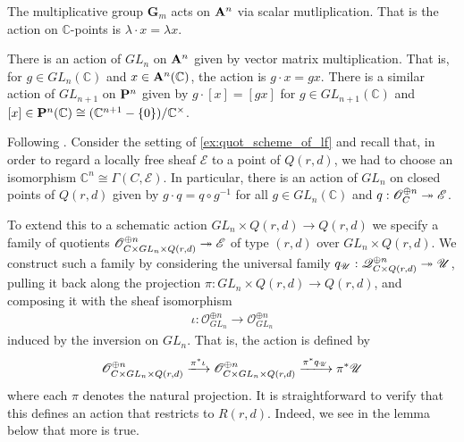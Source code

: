 \documentclass[12pt]{ociamthesis}  %
\begin{document}
\begin{example}
  The multiplicative group $\mathbf G_m$ acts on $\mathbf{A}^{n}_{}$
  via scalar mutliplication. That is the action on $\mathbb C$-points
  is $\lambda\cdot x = \lambda x$.
\end{example}

\begin{example}
  There is an action of $GL_n$ on $\mathbf{A}^{n}_{}$ given by vector
  matrix multiplication. That is, for $g\in GL_n(\mathbb C)$
  and $x\in\mathbf{A}^{n}_{}(\mathbb C)$, the action is $g\cdot x = gx$.
  There is a similar action of $GL_{n+1}$ on $\mathbf{P}^{n}_{}$
  given by $g\cdot[x] = [gx]$ for $g\in GL_{n+1}(\mathbb C)$
  and $[x]\in\mathbf{P}^{n}_{}(\mathbb C) \cong (\mathbb C^{n+1} - \{0\})/\mathbb C^\times$.
\end{example}

\begin{example}\label{ex:lf_action}
  Following \cite[Lemma 8.49]{hoskins2016}.
  Consider the setting of \ref{ex:quot_scheme_of_lf} and recall
  that, in order to regard a locally free sheaf $\mathscr E$ to a point of
  $Q(r,d)$, we had to choose an isomorphism
  $\mathbb C^n \cong \Gamma(C,\mathscr E)$. In particular, there
  is an action of $GL_n$ on closed points of $Q(r,d)$
  given by $g\cdot q = q\circ g^{-1}$ for all $g\in GL_n(\mathbb C)$
  and $q : \mathscr O^{\oplus n}_C \twoheadrightarrow \mathscr E$.

  To extend this to a schematic action $GL_n \times Q(r,d) \to Q(r,d)$
  we specify a family of quotients
  $\mathscr O^{\oplus n}_{C\times GL_n\times Q(r,d)}\twoheadrightarrow \mathscr E$
  of type $(r,d)$ over $GL_n\times Q(r,d)$. We construct such a family by
  considering the universal family $q_{\mathscr U}:\mathscr Q^{\oplus n}_{C\times Q(r,d)}\twoheadrightarrow \mathscr U$,
  pulling it back along the projection $\pi:GL_n\times Q(r,d)\to Q(r,d)$,
  and composing it with the sheaf isomorphism
  \begin{align*}
    \iota : \mathscr O^{\oplus n}_{GL_n} \to \mathscr O^{\oplus n}_{GL_n}
  \end{align*}
  induced by the inversion on $GL_n$. That is, the action is defined
  by
  \begin{align*}
    \mathscr O^{\oplus n}_{C\times GL_n\times Q(r,d)}
    \xlongrightarrow{\pi^*\iota}
    \mathscr O^{\oplus n}_{C\times GL_n\times Q(r,d)}
    \xlongrightarrow{\pi^*q_{\mathscr U}}
    \pi^*\mathscr U
  \end{align*}
  where each $\pi$ denotes the natural projection. It is straightforward
  to verify that this defines an action that restricts to $R(r,d)$.
  Indeed, we see in the lemma below that more is true.
\end{example}
\end{document}
